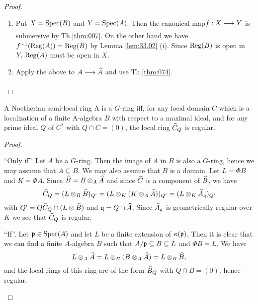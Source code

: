 \documentclass[../main]{subfiles}
\begin{document}
\begin{proof}
\begin{enumerate}
    \item Put $X=\operatorname{Spec}(B)$ and $Y=\operatorname{Spec}(A)$. Then the canonical map\newline $f: X \varrightarrow{} Y$ is submersive by Th.\ref{thm:007}. On the other hand we have \newline $f^{-1}(\operatorname{Reg}(A))=\operatorname{Reg}(B)$ by Lemma \ref{lem:33.02} (i). Since $\operatorname{Reg}(B)$ is open in $Y,\, \operatorname{Reg}(A)$ must be open in $X$.

    \item Apply the above to $A \varrightarrow{} \completion{A}$ and use Th.\ref{thm:074}.\end{enumerate}
\end{proof}

\begin{parlemma}\label{lem:33.03} A Noetherian semi-local ring A is a $G$-ring iff, for any local domain $C$ which is a localization of a finite A-algebra $B$ with respect to a maximal ideal, and for any prime ideal $Q$ of $C^*$ with $Q \cap C=(0)$, the local ring $\widehat{C}_Q$ is regular.
\end{parlemma}

\begin{proof}\phantom{,}
\begin{implyenumerate}
    \item[``Only if''.] Let $A$ be a $G$-ring. Then the image of $A$ in $B$ is also a $G$-ring, hence we may assume that $A \subseteq B$. We may also assume that $B$ is a domain. Let $L=\Phi B$ and $K=\Phi A$. Since $\widehat{B}=B\otimes_A \widehat{A}$ and since $\widehat{C}$ is a component of $\widehat{B}$, we have
    \[\widehat{C}_Q = (L\otimes_B \widehat{B})_{Q'} = (L\otimes_K (K\otimes_A\widehat{A}))_{Q'}=(L\otimes_K \widehat{A}_{\mathfrak{q}})_{Q'}\]
    with $Q'= Q\widehat{C}_Q \cap (L\otimes \widehat{B}) $ and $\mathfrak{q}=Q\cap \widehat{A}$. Since $\widehat{A}_{\mathfrak{q}}$ is geometrically regular over $K$ we see that $\widehat{C}_Q$ is regular.
    \item[``If''.] Let $\mathfrak{p} \in \operatorname{Spec}(A)$ and let $L$ be a finite extension
    of $\kappa(\mathfrak{p})$. Then it is clear that we can find a finite $A$-algebra $B$ such that $A / \mathfrak{p} \subseteq B \subseteq L$ and $\Phi B=L$. We have \[L \otimes_A \widehat{A}=L \otimes_B(B \otimes_A \widehat{A})=L \otimes_B \widehat{B},\] and the local rings of this ring are of the form $ \widehat{B}_Q$ with $Q \cap B=(0)$, hence regular.
\end{implyenumerate}
\end{proof}
\end{document}
